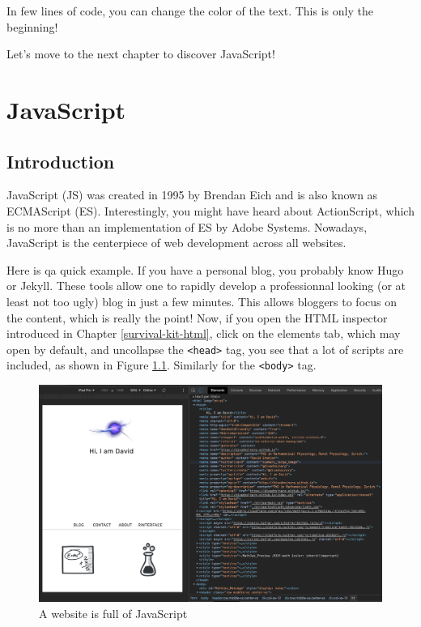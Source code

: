 \documentclass[]{book}
\begin{document}
In few lines of code, you can change the color of the text. This is only the beginning!

Let's move to the next chapter to discover JavaScript!

\hypertarget{survival-kit-javascript}{%
\chapter{JavaScript}\label{survival-kit-javascript}}

\hypertarget{introduction}{%
\section{Introduction}\label{introduction}}

JavaScript (JS) was created in 1995 by Brendan Eich and is also known as ECMAScript (ES). Interestingly, you might have heard about ActionScript, which is no more than an implementation of ES by Adobe Systems. Nowadays, JavaScript is the centerpiece of web development across all websites.

Here is qa quick example. If you have a personal blog, you probably know Hugo or Jekyll. These tools allow one to rapidly develop a professionnal looking (or at least not too ugly) blog in just a few minutes. This allows bloggers to focus on the content, which is really the point! Now, if you open the HTML inspector introduced in Chapter \ref{survival-kit-html}, click on the elements tab, which may open by default, and uncollapse the \texttt{\textless{}head\textgreater{}} tag, you see that a lot of scripts are included, as shown in Figure \ref{fig:scripts-list}. Similarly for the \texttt{\textless{}body\textgreater{}} tag.

\begin{figure}
\includegraphics[width=34.86in]{images/survival-kit/scripts-list} \caption{A website is full of JavaScript}\label{fig:scripts-list}
\end{figure}
\end{document}
